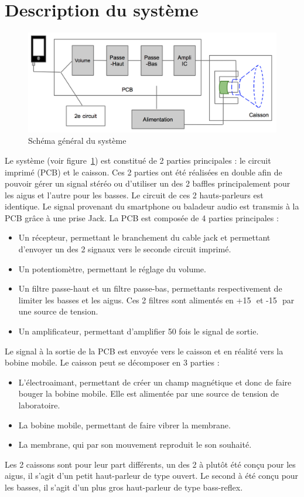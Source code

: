 \section{Description du système}

\begin{figure}
\begin{center}
\includegraphics[width=\textwidth]{img/schemacomplet} 
\end{center}
\caption{Schéma général du système}		
\label{fig:schemacomplet}		
\end{figure}

Le système (voir figure~\ref{fig:schemacomplet}) est constitué de 2 parties principales : le circuit imprimé (PCB) et le caisson. 
Ces 2 parties ont été réalisées en double afin de pouvoir gérer un signal stéréo ou d'utiliser un des 2 baffles principalement pour les aigus et l'autre pour les basses. Le circuit de ces 2 hauts-parleurs est identique.
Le signal provenant du smartphone ou baladeur audio est transmis à la PCB grâce à une prise Jack.
La PCB est composée de 4 parties principales :
\begin{itemize}
\item Un récepteur, permettant le branchement du cable jack et permettant d'envoyer un des 2 signaux vers le seconde circuit imprimé.
\item Un potentiomètre, permettant le réglage du volume.
\item Un filtre passe-haut et un filtre passe-bas, permettants respectivement de limiter les basses et les aigus. Ces 2 filtres sont alimentés en +15\,\volt \, et -15\,\volt \, par une source de tension.
\item Un amplificateur, permettant d'amplifier 50 fois le signal de sortie.
\end{itemize}
Le signal à la sortie de la PCB est envoyée vers le caisson et en réalité vers la bobine mobile.
Le caisson peut se décomposer en 3 parties :
\begin{itemize}
\item L'électroaimant, permettant de créer un champ magnétique et donc de faire bouger la bobine mobile. Elle est alimentée par une source de tension de laboratoire.
\item La bobine mobile, permettant de faire vibrer la membrane.
\item La membrane, qui par son mouvement reproduit le son souhaité.
\end{itemize}
Les 2 caissons sont pour leur part différents, un des 2 à plutôt été conçu pour les aigus, il s'agit d'un petit haut-parleur de type ouvert. Le second à été conçu pour les basses, il s'agit d'un plus gros haut-parleur de type bass-reflex.